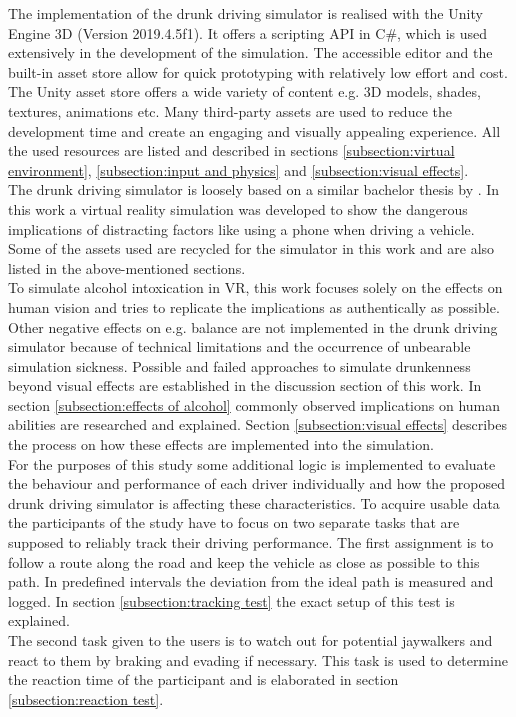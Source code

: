 The implementation of the drunk driving simulator is realised with the Unity Engine 3D (Version 2019.4.5f1).
It offers a scripting API in C\#, which is used extensively in the development of the simulation. 
The accessible editor and the built-in asset store allow for quick prototyping with relatively low effort and cost.
The Unity asset store offers a wide variety of content e.g. 3D models, shades, textures, animations etc.
Many third-party assets are used to reduce the development time and create an engaging and visually appealing experience. 
All the used resources are listed and described in sections \ref{subsection:virtual environment}, \ref{subsection:input and physics} and \ref{subsection:visual effects}.
\\
The drunk driving simulator is loosely based on a similar bachelor thesis by \textcite{birgmann2018simulation}.
In this work a virtual reality simulation was developed to show the dangerous implications of distracting factors like using a phone when driving a vehicle.
Some of the assets used are recycled for the simulator in this work and are also listed in the above-mentioned sections.
\\
To simulate alcohol intoxication in VR, this work focuses solely on the effects on human vision and tries to replicate the implications as authentically as possible.
Other negative effects on e.g. balance are not implemented in the drunk driving simulator because of technical limitations and the occurrence of unbearable simulation sickness.
Possible and failed approaches to simulate drunkenness beyond visual effects are established in the discussion section of this work.
In section \ref{subsection:effects of alcohol} commonly observed implications on human abilities are researched and explained.
Section \ref{subsection:visual effects} describes the process on how these effects are implemented into the simulation.
\\
For the purposes of this study some additional logic is implemented to evaluate the behaviour and performance of each driver individually and how the proposed drunk driving simulator is affecting these characteristics.
To acquire usable data the participants of the study have to focus on two separate tasks that are supposed to reliably track their driving performance.
The first assignment is to follow a route along the road and keep the vehicle as close as possible to this path.
In predefined intervals the deviation from the ideal path is measured and logged.
In section \ref{subsection:tracking test} the exact setup of this test is explained.
\\
The second task given to the users is to watch out for potential jaywalkers and react to them by braking and evading if necessary.
This task is used to determine the reaction time of the participant and is elaborated in section \ref{subsection:reaction test}.

